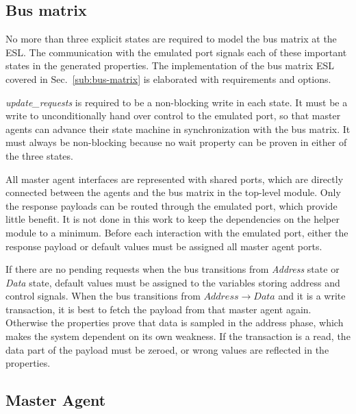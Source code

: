 \subsection{Bus matrix}
No more than three explicit states are required to model the bus matrix at the ESL. The communication with the emulated port signals each of these important states in the generated properties. The implementation of the bus matrix ESL covered in Sec.~\ref{sub:bus-matrix} is elaborated with requirements and options. \par
\textit{update\_requests} is required to be a non-blocking write in each state. It must be a write to unconditionally hand over control to the emulated port, so that master agents can advance their state machine in synchronization with the bus matrix. It must always be non-blocking because no wait property can be proven in either of the three states. \par
All master agent interfaces are represented with shared ports, which are directly connected between the agents and the bus matrix in the top-level module. Only the response payloads can be routed through the emulated port, which provide little benefit. It is not done in this work to keep the dependencies on the helper module to a minimum. Before each interaction with the emulated port, either the response payload or default values must be assigned all master agent ports. \par
If there are no pending requests when the bus transitions from \textit{Address} state or \textit{Data} state, default values must be assigned to the variables storing address and control signals. When the bus transitions from $Address\rightarrow Data$ and it is a write transaction, it is best to fetch the payload from that master agent again. Otherwise the properties prove that data is sampled in the address phase, which makes the system dependent on its own weakness. If the transaction is a read, the data part of the payload must be zeroed, or wrong values are reflected in the properties. \par
{} 
 

\subsection{Master Agent}
  
